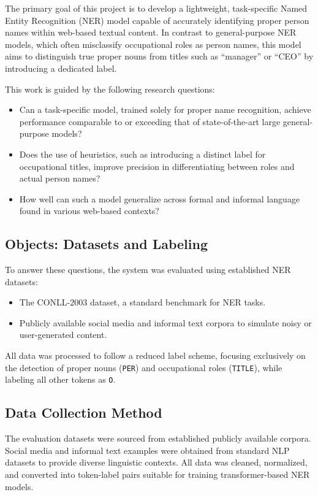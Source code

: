 \documentclass[a4paper]{usiinfbachelorproject}
\begin{document}
The primary goal of this project is to develop a lightweight, task-specific Named Entity Recognition (NER) model capable of accurately identifying proper person names within web-based textual content. In contrast to general-purpose NER models, which often misclassify occupational roles as person names, this model aims to distinguish true proper nouns from titles such as “manager” or “CEO” by introducing a dedicated label.

This work is guided by the following research questions:

\begin{itemize}
  \item Can a task-specific model, trained solely for proper name recognition, achieve performance comparable to or exceeding that of state-of-the-art large general-purpose models?
  \item Does the use of heuristics, such as introducing a distinct label for occupational titles, improve precision in differentiating between roles and actual person names?
  \item How well can such a model generalize across formal and informal language found in various web-based contexts?
\end{itemize}

\subsection{Objects: Datasets and Labeling}

To answer these questions, the system was evaluated using established NER datasets:

\begin{itemize}
  \item The CONLL-2003 dataset, a standard benchmark for NER tasks.
  \item Publicly available social media and informal text corpora to simulate noisy or user-generated content.
\end{itemize}

All data was processed to follow a reduced label scheme, focusing exclusively on the detection of proper nouns (\texttt{PER}) and occupational roles (\texttt{TITLE}), while labeling all other tokens as \texttt{O}.

\subsection{Data Collection Method}

The evaluation datasets were sourced from established publicly available corpora. Social media and informal text examples were obtained from standard NLP datasets to provide diverse linguistic contexts. All data was cleaned, normalized, and converted into token-label pairs suitable for training transformer-based NER models.
\end{document}
